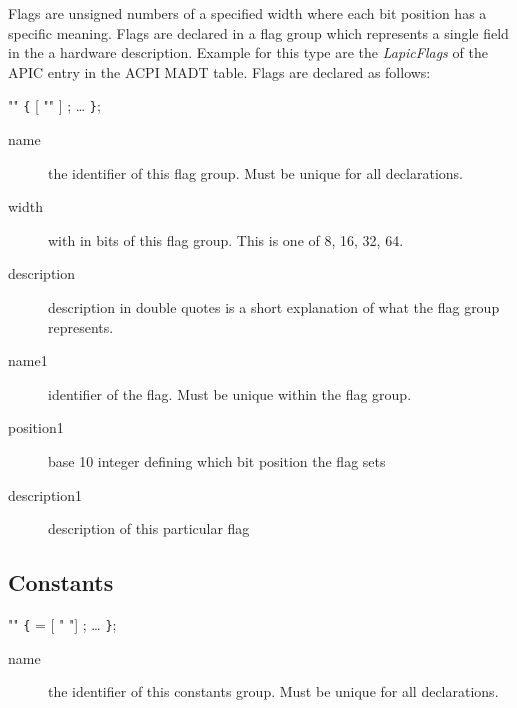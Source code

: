 \documentclass[a4paper,11pt,twoside]{report}
\begin{document}
{{Flags are unsigned numbers of a specified width where each bit position has a
specific meaning. Flags are declared in a flag group which represents a single
field in the a hardware description. Example for this type are the 
\emph{LapicFlags} of the APIC entry in the ACPI MADT table. Flags are declared 
as follows:

\begin{syntax}
   "" \verb+{+
      [ "" ] ;
    \ldots
\verb+}+;
\end{syntax}

\begin{description}
    \item[name] the identifier of this flag group. Must be unique for all 
    declarations.
    
    \item [width] with in bits of this flag group. This is one of 8, 16, 32, 64.
    
    \item [description] description in double quotes is a short explanation of
                        what the flag group represents.
    
    \item [name1] identifier of the flag. Must be unique within the flag group. 
    
    \item [position1] base 10 integer defining which bit position the flag sets
    
    \item [description1] description of this particular flag
        
\end{description}

\subsection{Constants}

\begin{syntax}
   "" \verb+{+
     =  [ " "] ;
    \ldots
\verb+}+;
\end{syntax}

\begin{description}
    \item[name] the identifier of this constants group. Must be unique for all 
    declarations.
    

\end{description}}}
\end{document}
